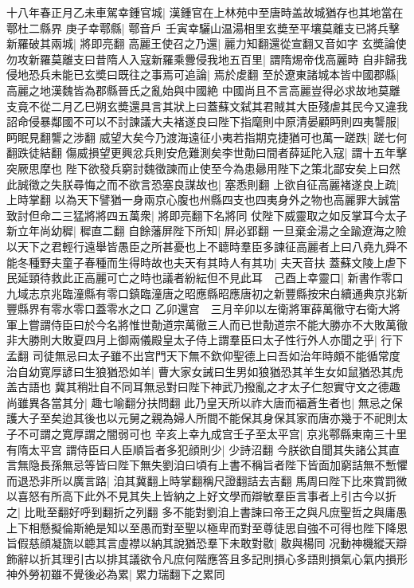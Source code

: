 十八年春正月乙未車駕幸鍾官城|{
	漢鍾官在上林苑中至唐時盖故城猶存也其地當在鄠杜二縣界}
庚子幸鄠縣|{
	鄠音戶}
壬寅幸驪山温湯相里玄奬至平壤莫離支已將兵擊新羅破其兩城|{
	將即亮翻}
高麗王使召之乃還|{
	麗力知翻還從宣翻又音如字}
玄奬論使勿攻新羅莫離支曰昔隋人入寇新羅乘釁侵我地五百里|{
	謂隋焬帝伐高麗時}
自非歸我侵地恐兵未能已玄奬曰既往之事焉可追論|{
	焉於䖍翻}
至於遼東諸城本皆中國郡縣|{
	高麗之地漢魏皆為郡縣晉氏之亂始與中國絶}
中國尚且不言高麗豈得必求故地莫離支竟不從二月乙巳朔玄奬還具言其狀上曰蓋蘇文弑其君賊其大臣殘虐其民今又違我詔命侵暴鄰國不可以不討諫議大夫褚遂良曰陛下指麾則中原清晏顧眄則四夷讋服|{
	眄眠見翻讋之涉翻}
威望大矣今乃渡海遠征小夷若指期克捷猶可也萬一蹉跌|{
	蹉七何翻跌徒結翻}
傷威損望更興忿兵則安危難測矣李世勣曰間者薛延陀入寇|{
	謂十五年擊突厥思摩也}
陛下欲發兵窮討魏徵諫而止使至今為患曏用陛下之策北鄙安矣上曰然此誠徵之失朕尋悔之而不欲言恐塞良謀故也|{
	塞悉則翻}
上欲自征高麗褚遂良上疏|{
	上時掌翻}
以為天下譬猶一身兩京心腹也州縣四支也四夷身外之物也高麗罪大誠當致討但命二三猛將將四五萬衆|{
	將即亮翻下名將同}
仗陛下威靈取之如反掌耳今太子新立年尚幼穉|{
	穉直二翻}
自餘藩屏陛下所知|{
	屛必郢翻}
一旦棄金湯之全踰遼海之險以天下之君輕行遠舉皆愚臣之所甚憂也上不聼時羣臣多諫征高麗者上曰八堯九舜不能冬種野夫童子春種而生得時故也夫天有其時人有其功|{
	夫天音扶}
蓋蘇文陵上虐下民延頸待救此正高麗可亡之時也議者紛紜但不見此耳　己酉上幸靈口|{
	新書作零口九域志京兆臨潼縣有零口鎮臨潼唐之昭應縣昭應唐初之新豐縣按宋白續通典京兆新豐縣界有零水零口蓋零水之口}
乙卯還宫　三月辛卯以左衛將軍薛萬徹守右衛大將軍上嘗謂侍臣曰於今名將惟世勣道宗萬徹三人而已世勣道宗不能大勝亦不大敗萬徹非大勝則大敗夏四月上御兩儀殿皇太子侍上謂羣臣曰太子性行外人亦聞之乎|{
	行下孟翻}
司徒無忌曰太子雖不出宫門天下無不欽仰聖德上曰吾如治年時頗不能循常度治自幼寛厚諺曰生狼猶恐如羊|{
	曹大家女誡曰生男如狼猶恐其羊生女如鼠猶恐其虎盖古語也}
冀其稍壯自不同耳無忌對曰陛下神武乃撥亂之才太子仁恕實守文之德趣尚雖異各當其分|{
	趣七喻翻分扶問翻}
此乃皇天所以祚大唐而褔蒼生者也|{
	無忌之保護大子至矣迨其後也以元舅之親為婦人所間不能保其身保其家而唐亦幾于不祀則太子不可謂之寛厚謂之闇弱可也}
辛亥上幸九成宫壬子至太平宫|{
	京兆鄠縣東南三十里有隋太平宫}
謂侍臣曰人臣順旨者多犯顔則少|{
	少詩沼翻}
今朕欲自聞其失諸公其直言無隐長孫無忌等皆曰陛下無失劉洎曰頃有上書不稱旨者陛下皆面加窮詰無不慙懼而退恐非所以廣言路|{
	洎其冀翻上時掌翻稱尺證翻詰去吉翻}
馬周曰陛下比來賞罰微以喜怒有所高下此外不見其失上皆納之上好文學而辯敏羣臣言事者上引古今以折之|{
	比毗至翻好呼到翻折之列翻}
多不能對劉洎上書諫曰帝王之與凡庶聖哲之與庸愚上下相懸擬倫斯絶是知以至愚而對至聖以極卑而對至尊徒思自強不可得也陛下降恩旨假慈顔凝旒以聼其言虛襟以納其說猶恐羣下未敢對敭|{
	敭與楊同}
况動神機縱天辯飾辭以折其理引古以排其議欲令凡庶何階應答且多記則損心多語則損氣心氣内損形神外勞初雖不覺後必為累|{
	累力瑞翻下之累同}
